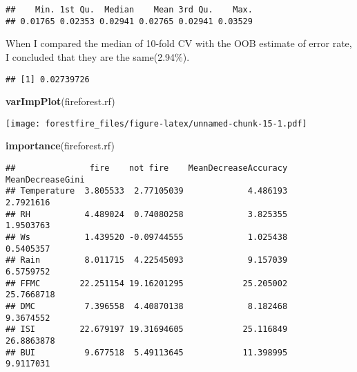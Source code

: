 \documentclass[
]{article}
\newenvironment{Shaded}{\begin{snugshade}}{\end{snugshade}}
\newcommand{\DecValTok}[1]{\textcolor[rgb]{0.00,0.00,0.81}{#1}}
\newcommand{\KeywordTok}[1]{\textcolor[rgb]{0.13,0.29,0.53}{\textbf{#1}}}
\newcommand{\NormalTok}[1]{#1}
\newcommand{\OperatorTok}[1]{\textcolor[rgb]{0.81,0.36,0.00}{\textbf{#1}}}
\begin{document}
\begin{verbatim}
##    Min. 1st Qu.  Median    Mean 3rd Qu.    Max. 
## 0.01765 0.02353 0.02941 0.02765 0.02941 0.03529
\end{verbatim}

When I compared the median of 10-fold CV with the OOB estimate of error
rate, I concluded that they are the same(2.94\%).

\begin{Shaded}
\end{Shaded}

\begin{verbatim}
## [1] 0.02739726
\end{verbatim}

\begin{Shaded}
\begin{Highlighting}[]
\KeywordTok{varImpPlot}\NormalTok{(fireforest.rf)}
\end{Highlighting}
\end{Shaded}

\texttt{[image: forestfire\_files/figure-latex/unnamed-chunk-15-1.pdf]}

\begin{Shaded}
\begin{Highlighting}[]
\KeywordTok{importance}\NormalTok{(fireforest.rf)}
\end{Highlighting}
\end{Shaded}

\begin{verbatim}
##               fire    not fire    MeanDecreaseAccuracy MeanDecreaseGini
## Temperature  3.805533  2.77105039             4.486193        2.7921616
## RH           4.489024  0.74080258             3.825355        1.9503763
## Ws           1.439520 -0.09744555             1.025438        0.5405357
## Rain         8.011715  4.22545093             9.157039        6.5759752
## FFMC        22.251154 19.16201295            25.205002       25.7668718
## DMC          7.396558  4.40870138             8.182468        9.3674552
## ISI         22.679197 19.31694605            25.116849       26.8863878
## BUI          9.677518  5.49113645            11.398995        9.9117031
\end{verbatim}
\end{document}
